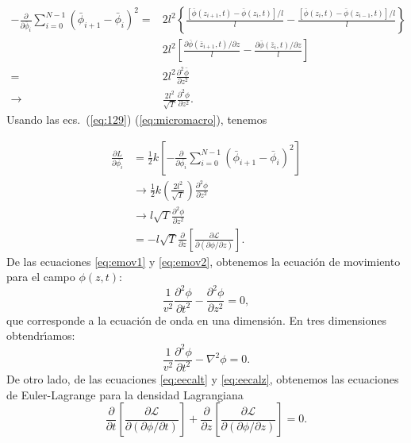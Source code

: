 \begin{align}
  -\frac{\partial}{\partial\bar\phi_i}  \sum_{i=0}^{N-1}\left(\bar\phi_{i+1}-\bar\phi_{i}\right)^2
  =&2l^2\left\{\frac{[\bar\phi(z_{i+1},t)-\bar\phi(z_{i},t)]/l}{l}-\frac{[\bar\phi(z_{i},t)-\bar\phi(z_{i-1},t)]/l}{l}\right\}\nonumber\\
&2l^2\left[\frac{\partial\bar\phi(\bar z_{i+1},t)/\partial z}{l}-\frac{\partial\bar\phi(\bar z_{i},t)/\partial z}{l}\right]\nonumber\\
  =&2l^2\frac{\partial^2\bar\phi}{\partial z^2}\nonumber\\
  \label{eq:129}
  \to&\frac{2l^2}{\sqrt{T}}\frac{\partial^2\phi}{\partial z^2}.
\end{align}
Usando las ecs.~(\ref{eq:129}) (\ref{eq:micromacro}), tenemos

\begin{align}
  \label{eq:emov2}
  \frac{\partial L}{\partial\bar{\phi_i}}
&=\frac{1}{2}k
\left[-\frac{\partial}{\partial\bar{\phi_i}}\sum_{i=0}^{N-1}\left(\bar\phi_{i+1}-\bar\phi_{i}\right)^2\right]
\nonumber\\
&\to\frac{1}{2}k\left(\frac{2l^2}{\sqrt{T}}\right)\frac{\partial^2\phi}{\partial z^2}
\nonumber\\
&\to  l\sqrt{T}
      \frac{\partial^2\phi}{\partial z^2}\\
  \label{eq:eecalz}
  &=-l\sqrt{T}\frac{\partial}{\partial z}
  \left[
    \frac{\partial\mathcal{L}}{\partial
      (\partial\phi/\partial z)}
  \right].
\end{align}
De las ecuaciones \eqref{eq:emov1} y \eqref{eq:emov2}, obtenemos la
ecuaci\'on de movimiento para el campo $\phi(z,t)$:
\begin{equation}
  \label{eq:econda1}
    \frac{1}{v^2}\frac{\partial^2\phi}{\partial t^2}-\frac{\partial^2\phi}{\partial z^2}=0,
\end{equation}
que corresponde a la ecuaci\'on de onda en una dimensi\'on. En tres
dimensiones obtendr\'\i amos:
\begin{equation}
  \label{eq:econda3}
    \frac{1}{v^2}\frac{\partial^2\phi}{\partial t^2}-\nabla^2\phi=0.
\end{equation}
De otro lado, de las ecuaciones 
\eqref{eq:eecalt} %
y \eqref{eq:eecalz}, %
obtenemos las ecuaciones de Euler-Lagrange para la densidad Lagrangiana
\begin{equation}
  \label{eq:eelcalls1}
\frac{\partial}{\partial t}
  \left[
    \frac{\partial\mathcal{L}}{\partial
      (\partial\phi/\partial t)}
  \right]+  \frac{\partial}{\partial z}
  \left[
    \frac{\partial\mathcal{L}}{\partial
      (\partial\phi/\partial z)}
  \right]=0.
\end{equation}
